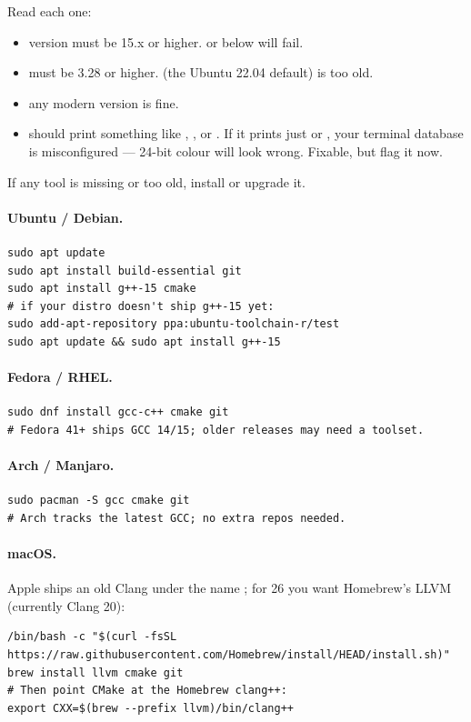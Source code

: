 Read each one:

\begin{itemize}[leftmargin=*]
  \item {} version must be 15.x or higher.  or
    below will fail.
  \item {} must be 3.28 or higher.  (the
    Ubuntu 22.04 default) is too old.
  \item {} any modern version is fine.
  \item {} should print something like
    , , or
    . If it prints just  or ,
    your terminal database is misconfigured --- 24-bit colour will
    look wrong. Fixable, but flag it now.
\end{itemize}

If any tool is missing or too old, install or upgrade it.

\paragraph{Ubuntu / Debian.}
\begin{lstlisting}[style=shell]
sudo apt update
sudo apt install build-essential git
sudo apt install g++-15 cmake
# if your distro doesn't ship g++-15 yet:
sudo add-apt-repository ppa:ubuntu-toolchain-r/test
sudo apt update && sudo apt install g++-15
\end{lstlisting}

\paragraph{Fedora / RHEL.}
\begin{lstlisting}[style=shell]
sudo dnf install gcc-c++ cmake git
# Fedora 41+ ships GCC 14/15; older releases may need a toolset.
\end{lstlisting}

\paragraph{Arch / Manjaro.}
\begin{lstlisting}[style=shell]
sudo pacman -S gcc cmake git
# Arch tracks the latest GCC; no extra repos needed.
\end{lstlisting}

\paragraph{macOS.}
Apple ships an old Clang under the name ; for \cpp{}26 you
want Homebrew's LLVM (currently Clang 20):
\begin{lstlisting}[style=shell]
/bin/bash -c "$(curl -fsSL https://raw.githubusercontent.com/Homebrew/install/HEAD/install.sh)"
brew install llvm cmake git
# Then point CMake at the Homebrew clang++:
export CXX=$(brew --prefix llvm)/bin/clang++
\end{lstlisting}

